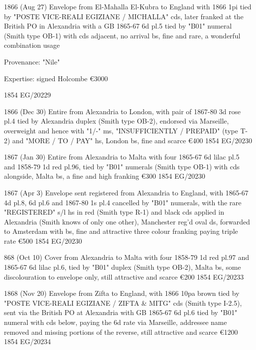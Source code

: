 \documentclass[justified]{tufte-book}
\begin{document}
%
{1866 (Aug 27) Envelope from El-Mahalla El-Kubra to England with 1866 1pi tied by "POSTE VICE-REALI EGIZIANE / MICHALLA" cds, later franked at the British PO in Alexandria with a GB 1865-67 6d pl.5 tied by "B01" numeral (Smith type OB-1) with cds adjacent, no arrival bs, fine and rare, a wonderful combination usage

Provenance: "Nile"

Expertise: signed Holcombe \euro3000
}
{1854}%
{EG/20229}%
{}%
{}
{}%
{}

%
{1866 (Dec 30) Entire from Alexandria to London, with pair of 1867-80 3d rose pl.4 tied by Alexandria duplex (Smith type OB-2), endorsed via Marseille, overweight and hence with "1/-" ms, "INSUFFICIENTLY / PREPAID" (type T-2) and "MORE / TO / PAY" hs, London bs, fine and scarce \euro400
}
{1854}%
{EG/20230}%
{}%
{}
{}%
{}


%
{1867 (Jan 30) Entire from Alexandria to Malta with four 1865-67 6d lilac pl.5 and 1858-79 1d red pl.96, tied by "B01" numerals (Smith type OB-1) with cds alongside, Malta bs, a fine and high franking \euro300
}
{1854}%
{EG/20230}%
{}%
{}
{}%
{}

%
{1867 (Apr 3) Envelope sent registered from Alexandria to England, with 1865-67 4d pl.8, 6d pl.6 and 1867-80 1s pl.4 cancelled by "B01" numerals, with the rare "REGISTERED" s/l hs in red (Smith type R-1) and black cds applied in Alexandria (Smith knows of only one other), Manchester reg'd oval ds, forwarded to Amsterdam with bs, fine and attractive three colour franking paying triple rate \euro500
}
{1854}%
{EG/20230}%
{}%
{}
{}%
{}


%
{868 (Oct 10) Cover from Alexandria to Malta with four 1858-79 1d red pl.97 and 1865-67 6d lilac pl.6, tied by "B01" duplex (Smith type OB-2), Malta bs, some discolouration to envelope only, still attractive and scarce \euro200
}
{1854}%
{EG/20233}%
{}%
{}
{}%
{}

%
{1868 (Nov 20) Envelope from Zifta to England, with 1866 10pa brown tied by "POSTE VICE-REALI EGIZIANE / ZIFTA \& MITG" cds (Smith type I-2.5), sent via the British PO at Alexandria with GB 1865-67 6d pl.6 tied by "B01" numeral with cds below, paying the 6d rate via Marseille, addressee name removed and missing portions of the reverse, still attractive and scarce
\euro1200
}
{1854}%
{EG/20234}%
{}%
{}
{}%
{}
\end{document}
